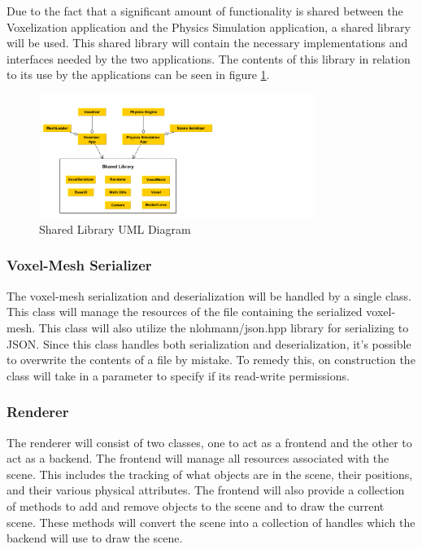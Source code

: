 Due to the fact that a significant amount of functionality is shared between the Voxelization
application and the Physics Simulation application, a shared library will be used. This shared
library will contain the necessary implementations and interfaces needed by the two applications. 
The contents of this library in relation to its use by the applications can be seen in figure
\ref{fig:SharedLibraryUML}.

\begin{figure}[h]
  \centering
  \includegraphics[width=0.8\textwidth, trim={0cm 0cm 15cm 0cm}]{SharedLibraryUML}
  \caption{Shared Library UML Diagram}
  \label{fig:SharedLibraryUML}
\end{figure}

\subsubsection{Voxel-Mesh Serializer}
The voxel-mesh serialization and deserialization will be handled by a single class. This class will
manage the resources of the file containing the serialized voxel-mesh. 
This class will also utilize the nlohmann/json.hpp library for serializing to JSON.
Since this class handles both serialization and deserialization, it's possible to overwrite the 
contents of a file by mistake. To remedy this, on construction the class will take in a parameter to 
specify if its read-write permissions. 

\subsubsection{Renderer}

The renderer will consist of two classes, one to act as a frontend and the other to act as a
backend. The frontend will manage all resources associated with the scene. This includes the 
tracking of what objects are in the scene, their positions, and their various physical attributes.
The frontend will also provide a collection of methods to add and remove objects to the scene and to 
draw the current scene. These methods will convert the scene into a collection of handles which the
backend will use to draw the scene.


